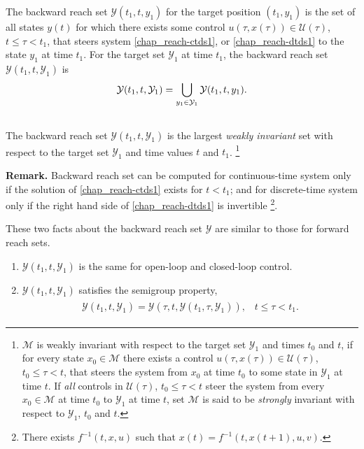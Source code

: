 \documentclass[letterpaper,10pt,english]{sphinxmanual}
\begin{document}
The backward reach set ${\mathcal Y}(t_1, t, y_1)$ for the target
position $(t_1, y_1)$ is the set of all states $y(t)$ for
which there exists some control
$u(\tau, x(\tau))\in{\mathcal U}(\tau)$,
$t\leqslant\tau<t_1$, that steers system \eqref{chap_reach-ctds1}, or \eqref{chap_reach-dtds1} to
the state $y_1$ at time $t_1$. For the target set
${\mathcal Y}_1$ at time $t_1$, the backward reach set
${\mathcal Y}(t_1, t, {\mathcal Y}_1)$ is
\begin{gather}
\begin{split}{\mathcal Y}(t_1, t, {\mathcal Y}_1) = \bigcup_{y_1\in{\mathcal Y}_1}{\mathcal Y}(t_1, t, y_1).\end{split}\notag\\\begin{split}\end{split}\notag
\end{gather}
The backward reach set
${\mathcal Y}(t_1, t, {\mathcal Y}_1)$ is the largest \emph{weakly
invariant} set with respect to the target set ${\mathcal Y}_1$ and
time values $t$ and $t_1$. \footnote{
${\mathcal M}$ is weakly invariant with respect to the target
set ${\mathcal Y}_1$ and times $t_0$ and $t$, if
for every state $x_0\in{\mathcal M}$ there exists a control
$u(\tau, x(\tau))\in{\mathcal U}(\tau)$,
$t_0\leqslant\tau< t$, that steers the system from $x_0$
at time $t_0$ to some state in ${\mathcal Y}_1$ at time
$t$. If \emph{all} controls in ${\mathcal U}(\tau)$,
$t_0\leqslant\tau<t$ steer the system from every
$x_0\in{\mathcal M}$ at time $t_0$ to
${\mathcal Y}_1$ at time $t$, set ${\mathcal M}$ is
said to be \emph{strongly} invariant with respect to
${\mathcal Y}_1$, $t_0$ and $t$.
}

\textbf{Remark.} Backward reach set can be computed for continuous-time
system only if the solution of \eqref{chap_reach-ctds1} exists for $t<t_1$; and
for discrete-time system only if the right hand side of \eqref{chap_reach-dtds1} is
invertible \footnote{
There exists $f^{-1}(t,x,u)$ such that
$x(t)=f^{-1}(t, x(t+1), u, v)$.
}.

These two facts about the backward reach set ${\mathcal Y}$ are
similar to those for forward reach sets.
\begin{enumerate}
\item {} 
${\mathcal Y}(t_1, t, {\mathcal Y}_1)$ is the same for
open-loop and closed-loop control.

\item {} 
${\mathcal Y}(t_1, t, {\mathcal Y}_1)$ satisfies the semigroup
property,
\label{chap_reach:equation-semigroup_b}\begin{gather}
\begin{split}{\mathcal Y}(t_1, t, {\mathcal Y}_1) = {\mathcal Y}(\tau, t, {\mathcal Y}(t_1, \tau, {\mathcal Y}_1)), \;\;\;
t\leqslant\tau< t_1.\end{split}\label{chap_reach-semigroup_b}
\end{gather}
\end{enumerate}
\end{document}
